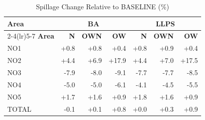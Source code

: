 \begin{table}[htbp]
\centering
\caption{Spillage Change Relative to BASELINE (\%)}
\label{tab:spillage_pct_baseline}
\small
\begin{tabular}{lrrrrrr}
\toprule
\textbf{Area} & \multicolumn{3}{c}{\textbf{BA}} & \multicolumn{3}{c}{\textbf{LLPS}} \\
\cmidrule(lr){2-4}\cmidrule(lr){5-7}
\textbf{Area} & \textbf{N} & \textbf{OWN} & \textbf{OW} & \textbf{N} & \textbf{OWN} & \textbf{OW} \\
\midrule
NO1 & +0.8 & +0.8 & +0.4 & +0.8 & +0.9 & +0.4 \\
NO2 & +4.4 & +6.9 & +17.9 & +4.4 & +7.0 & +17.5 \\
NO3 & -7.9 & -8.0 & -9.1 & -7.7 & -7.7 & -8.5 \\
NO4 & -5.0 & -5.0 & -6.1 & -4.1 & -4.5 & -5.5 \\
NO5 & +1.7 & +1.6 & +0.9 & +1.8 & +1.6 & +0.9 \\
TOTAL & -0.1 & +0.1 & +0.8 & +0.0 & +0.3 & +0.9 \\
\bottomrule
\end{tabular}
\end{table}